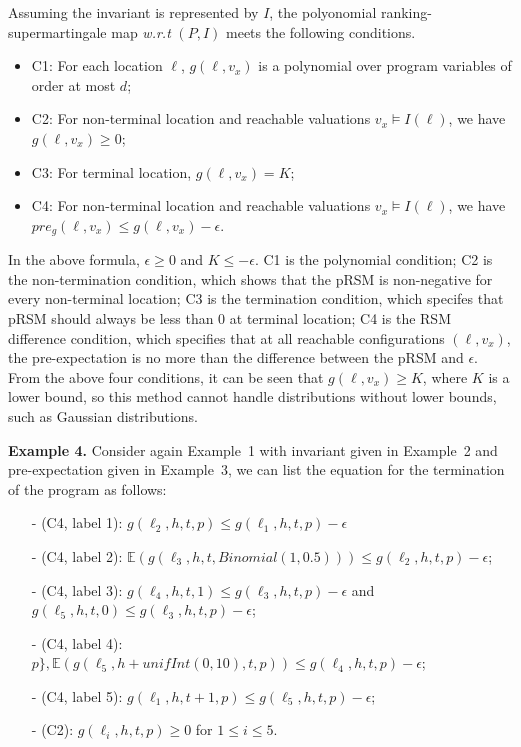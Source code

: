 \documentclass[conference]{IEEEtran}
\begin{document}
 Assuming the invariant is represented by $I$, the polyonomial ranking-supermartingale map \textit{w.r.t} $(P,I)$ meets the following conditions.
 \begin{itemize}
 	\item C1: For each location $\ell$, $g(\ell,v_x)$ is a polynomial over program variables of order at most $d$;
 	\item C2: For non-terminal location and reachable
 	valuations $v_x \vDash I(\ell)$, we have $g(\ell,v_x) \geq 0$;
 	\item C3: For terminal location, $g(\ell,v_x)=K$;
 	\item C4: For non-terminal location and reachable
 	valuations $v_x \vDash I(\ell)$, we have $pre_g(\ell,v_x) \leq g(\ell,v_x)-\epsilon$.
 \end{itemize}
 In the above formula, $\epsilon \geq 0$ and $K \leq -\epsilon$. C1 is the polynomial condition; C2 is the non-termination condition, which shows that the pRSM is non-negative for every non-terminal location; C3 is the termination condition, which specifes that pRSM should always be less than 0 at terminal location; C4 is the RSM difference condition, which specifies that at all reachable configurations $(\ell, v_x)$, the pre-expectation is no more than the difference between the pRSM and $\epsilon$. From the above four conditions, it can be seen that $g(\ell,v_x) \geq K$, where $K$ is a lower bound, so this method cannot handle distributions without lower bounds, such as Gaussian distributions.
 
  \textbf{Example 4.} Consider again Example~1 with invariant given in Example~2 and pre-expectation given in Example~3, we can list the equation for the termination of the program as follows:
 \begin{itemize}
 	\item[-] (C4, label 1): $g(\ell_2,h,t,p)\leq g(\ell_1,h,t,p)-\epsilon$
 	\item[-] (C4, label 2): $\mathbb{E}(g(\ell_3,h,t,Binomial(1,0.5))) \leq g(\ell_2,h,t,p)-\epsilon$;
 	\item[-] (C4, label 3): $g(\ell_4,h,t,1) \leq g(\ell_3,h,t,p)-\epsilon$ and $g(\ell_5,h,t,0) \leq g(\ell_3,h,t,p)-\epsilon$;
 	\item[-] (C4, label 4): $ p\},\mathbb{E}(g(\ell_5,h+unifInt(0,10),t,p)) \leq g(\ell_4,h,t,p)-\epsilon$;
 	\item[-] (C4, label 5): $g(\ell_1,h,t+1,p)\leq g(\ell_5,h,t,p)-\epsilon$;
 	\item[-] (C2): $g(\ell_i,h,t,p) \geq 0$ for $1\leq i \leq 5$.
 \end{itemize}
\end{document}
